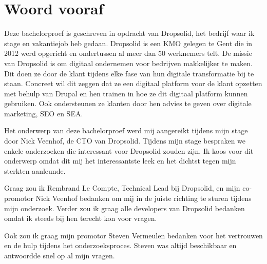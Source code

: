 
\chapter*{Woord vooraf}
\label{ch:voorwoord}

Deze bachelorproef is geschreven in opdracht van Dropsolid, het bedrijf waar ik stage en vakantiejob heb gedaan. Dropsolid is een \gls{KMO} gelegen te Gent die in 2012 werd opgericht en ondertussen al meer dan 50 werknemers telt. De missie van Dropsolid is om digitaal ondernemen voor bedrijven makkelijker te maken. Dit doen ze door de klant tijdens elke fase van hun digitale transformatie bij te staan. Concreet wil dit zeggen dat ze een digitaal platform voor de klant opzetten met behulp van Drupal en hen trainen in hoe ze dit digitaal platform kunnen gebruiken. Ook ondersteunen ze klanten door hen advies te geven over digitale marketing, \gls{SEO} en \gls{SEA}.

Het onderwerp van deze bachelorproef werd mij aangereikt tijdens mijn stage door Nick Veenhof, de CTO van Dropsolid. Tijdens mijn stage bespraken we enkele onderzoeken die interessant voor Dropsolid zouden zijn. Ik koos voor dit onderwerp omdat dit mij het interessantste leek en het dichtst tegen mijn sterkten aanleunde.

Graag zou ik Rembrand Le Compte, Technical Lead bij Dropsolid, en mijn co-promotor Nick Veenhof bedanken om mij in de juiste richting te sturen tijdens mijn onderzoek. Verder zou ik graag alle developers van Dropsolid bedanken omdat ik steeds bij hen terecht kon voor vragen.

Ook zou ik graag mijn promotor Steven Vermeulen bedanken voor het vertrouwen en de hulp tijdens het onderzoeksproces. Steven was altijd beschikbaar en antwoordde snel op al mijn vragen.

